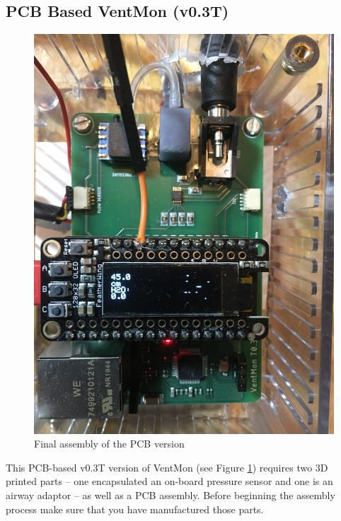 \documentclass[11pt, letterpaper]{article}
\begin{document}

\subsection{PCB Based VentMon (v0.3T)}


\begin{figure}[H]
\centering
\includegraphics[width=\textwidth]{images/PCBVentMon.JPG}
\caption{Final assembly of the PCB version}
\label{fig:finalPCB}
\end{figure}

This PCB-based v0.3T version of VentMon (see Figure \ref{fig:finalPCB}) requires two 3D printed parts  -- one encapsulated an on-board pressure sensor and one is an airway adaptor -- as well as a PCB assembly. Before beginning the assembly process make sure that you have manufactured those parts.
\end{document}

